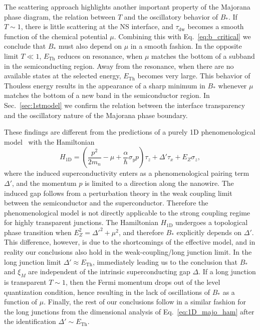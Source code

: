 \documentclass[twocolumn, notitlepage, 10pt, aps, floatfix, showpacs, prb, citeautoscript]{revtex4-1}
\newcommand{\comment}[1]{}
\begin{document}
\comment{In an open junction $\tau_\textrm{dw}$ is a smooth function, so there are no oscillations in $B_*$.}
The scattering approach highlights another important property of the Majorana phase diagram, the relation between $T$ and the oscillatory behavior of $B_*$.
If $T\sim 1$, there is little scattering at the NS interface, and $\tau_\textrm{dw}$ becomes a smooth function of the chemical potential $\mu$.
Combining this with Eq.~\eqref{eq:b_critical} we conclude that $B_*$ must also depend on $\mu$ in a smooth fashion.
In the opposite limit $T\ll 1$, $E_\textrm{Th}$ reduces on resonance, when $\mu$ matches the bottom of a subband in the semiconducting region.
Away from the resonance, when there are no available states at the selected energy, $E_\textrm{Th}$ becomes very large.
This behavior of Thouless energy results in the appearance of a sharp minimum in $B_*$ whenever $\mu$ matches the bottom of a new band in the semiconductor region.
In Sec.~\ref{sec:1stmodel} we confirm the relation between the interface transparency and the oscillatory nature of the Majorana phase boundary.

\comment{The long junction behavior is not so different}
These findings are different from the predictions of a purely 1D phenomenological model~\cite{Lutchyn2010, Oreg2010} with the Hamiltonian
\begin{equation}
\label{eq:1D_majo_ham}
H_\textrm{1D} = \left(\frac{p^2}{2m_n} -\mu +\frac{\alpha}{\hbar} \sigma_y p\right)\tau_z + \Delta' \tau_x + E_Z \sigma_z,
\end{equation}
where the induced superconductivity enters as a phenomenological pairing term $\Delta'$, and the momentum $p$ is limited to a direction along the nanowire.
The induced gap follows from a perturbation theory in the weak coupling limit between the semiconductor and the superconductor.
Therefore the phenomenological model is not directly applicable to the strong coupling regime for highly transparent junctions.
The Hamiltonian $H_\textrm{1D}$ undergoes a topological phase transition when $E_Z^2 = \Delta'^2 + \mu^2$, and therefore $B_*$ explicitly depends on $\Delta'$.
This difference, however, is due to the shortcomings of the effective model, and in reality our conclusions also hold in the weak-coupling/long junction limit.
In the long junction limit $\Delta'\approx E_\textrm{Th}$, immediately leading us to the conclusion that $B_*$ and $\xi_M$ are independent of the intrinsic superconducting gap $\Delta$.
If a long junction is transparent $T\sim 1$, then the Fermi momentum drops out of the level quantization condition, hence resulting in the lack of oscillations of $B_*$ as a function of $\mu$.
Finally, the rest of our conclusions follow in a similar fashion for the long junctions from the dimensional analysis of Eq.~\eqref{eq:1D_majo_ham} after the identification $\Delta'\sim E_\textrm{Th}$.
\end{document}

